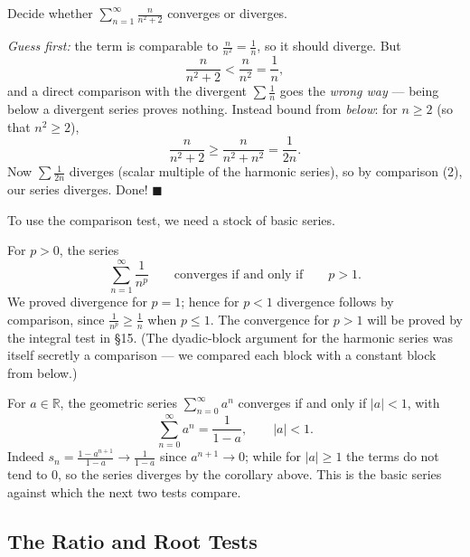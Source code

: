 \documentclass[11pt]{report}
\begin{document}
\begin{exbox}
Decide whether $\displaystyle\sum_{n=1}^{\infty} \frac{n}{n^2+2}$ converges or diverges.

\emph{Guess first:} the term is comparable to $\tfrac{n}{n^2} = \tfrac1n$, so it should diverge. But
\[
\frac{n}{n^2+2} < \frac{n}{n^2} = \frac1n,
\]
and a direct comparison with the divergent $\sum\tfrac1n$ goes the \emph{wrong way} --- being below a divergent series proves nothing. Instead bound from \emph{below}: for $n \geq 2$ (so that $n^2 \geq 2$),
\[
\frac{n}{n^2+2} \geq \frac{n}{n^2+n^2} = \frac{1}{2n}.
\]
Now $\sum \tfrac{1}{2n}$ diverges (scalar multiple of the harmonic series), so by comparison (2), our series diverges. Done! \hfill $\blacksquare$
\end{exbox}

To use the comparison test, we need a stock of basic series.

\begin{exbox}
For $p > 0$, the series
\[
\sum_{n=1}^\infty \frac{1}{n^p} \qquad \text{converges if and only if} \qquad p > 1.
\]
We proved divergence for $p = 1$; hence for $p < 1$ divergence follows by comparison, since $\tfrac{1}{n^p} \geq \tfrac1n$ when $p \leq 1$. The convergence for $p > 1$ will be proved by the integral test in \S 15. (The dyadic-block argument for the harmonic series was itself secretly a comparison --- we compared each block with a constant block from below.)
\end{exbox}

\begin{exbox}
For $a \in \mathbb{R}$, the geometric series $\sum_{n=0}^\infty a^n$ converges if and only if $|a| < 1$, with
\[
\sum_{n=0}^\infty a^n = \frac{1}{1-a}, \qquad |a| < 1.
\]
Indeed $s_n = \tfrac{1 - a^{n+1}}{1 - a} \to \tfrac{1}{1-a}$ since $a^{n+1} \to 0$; while for $|a| \geq 1$ the terms do not tend to $0$, so the series diverges by the corollary above. This is the basic series against which the next two tests compare.
\end{exbox}

\subsection{The Ratio and Root Tests}
\end{document}
